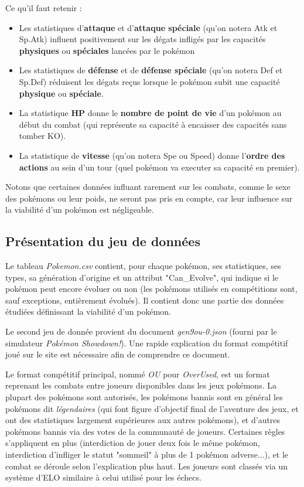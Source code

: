 \documentclass[a4paper,12pt]{article}
\begin{document}
Ce qu'il faut retenir :
\begin{itemize}
    \item Les statistiques d'\textbf{attaque} et d'\textbf{attaque spéciale}
    (qu'on notera Atk et Sp.Atk) influent positivement sur les dégats infligés
    par les capacités \textbf{physiques} ou \textbf{spéciales} lancées par le
    pokémon
    \item Les statistiques de \textbf{défense} et de \textbf{défense spéciale}
    (qu'on notera Def et Sp.Def) réduisent les dégats reçus lorsque le pokémon
    subit une capacité \textbf{physique} ou \textbf{spéciale}.
    \item La statistique \textbf{HP} donne le \textbf{nombre de point de vie}
    d'un pokémon au début du combat (qui représente sa capacité à encaisser des
    capacités sans tomber KO).
    \item La statistique de \textbf{vitesse} (qu'on notera Spe ou Speed) donne
    l'\textbf{ordre des actions} au sein d'un tour (quel pokémon va executer sa
    capacité en premier).
\end{itemize}

Notons que certaines données influant rarement sur les combats, comme le sexe
des pokémons ou leur poids, ne seront pas pris en compte, car leur influence sur
la viabilité d'un pokémon est négligeable.

\subsection{Présentation du jeu de données}
Le tableau \textit{Pokemon.csv} contient, pour chaque pokémon, ses statistiques,
ses types, sa génération d'origine et un attribut "Can\_Evolve", qui indique si
le pokémon peut encore évoluer ou non (les pokémons utilisés en compétitions
sont, sauf exceptions, entièrement évolués). Il contient donc une partie des
données étudiées définissant la viabilité d'un pokémon.

Le second jeu de donnée provient du document \textit{gen9ou-0.json} (fourni par
le simulateur \textit{Pokémon Showdown!}). Une rapide explication du format
compétitif joué sur le site est nécessaire afin de comprendre ce document.

Le format compétitif principal, nommé \textit{OU} pour \textit{OverUsed}, est un
format reprenant les combats entre joueurs disponibles dans les jeux pokémons.
La plupart des pokémons sont autorisés, les pokémons bannis sont en général les
pokémons dit \textit{légendaires} (qui font figure d'objectif final de
l'aventure des jeux, et ont des statistiques largement supérieures aux autres
pokémons), et d'autres pokémons bannis via des votes de la communauté de
joueurs. Certaines règles s'appliquent en plus (interdiction de jouer deux fois
le même pokémon, interdiction d'infliger le statut "sommeil" à plus de 1 pokémon
adverse...), et le combat se déroule selon l'explication plus haut. Les joueurs
sont classés via un système d'ELO similaire à celui utilisé pour les échecs.
\end{document}
